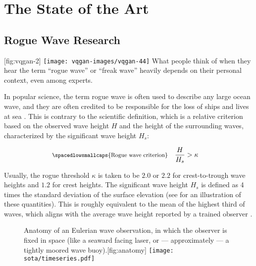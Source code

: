 \chapter{The State of the Art}

\section{Rogue Wave Research} \label{sec:sota-rogue}

[fig:vqgan-2]{
    \texttt{[image: vqgan-images/vqgan-44]}
}
%
What people think of when they hear the term \enquote{rogue wave} or \enquote{freak wave} heavily depends on their personal context, even among experts.

In popular science, the term rogue wave is often used to describe any large ocean wave, and they are often credited to be responsible for the loss of ships and lives at sea \citep{didenkulova_catalogue_2019}. This is contrary to the scientific definition, which is a relative criterion based on the observed wave height $H$ and the height of the surrounding waves, characterized by the significant wave height $H_s$:

\begin{align}
    \text{\footnotesize\spacedlowsmallcaps{Rogue wave criterion}} && \frac{H}{H_s} > \kappa && \label{eq:rogue}
\end{align}

Usually, the rogue threshold $\kappa$ is taken to be $2.0$ or $2.2$ for crest-to-trough wave heights and $1.2$ for crest heights. The significant wave height $H_s$ is defined as 4 times the standard deviation of the surface elevation (see  for an illustration of these quantities). This is roughly equivalent to the mean of the highest third of waves, which aligns with the average wave height reported by a trained observer \citep{holthuijsen_waves_2010}.

\begin{figure}
    \begin{sidecaption}{Anatomy of an Eulerian wave observation, in which the observer is fixed in space (like a seaward facing laser, or --- approximately --- a tightly moored wave buoy).}[fig:anatomy]
		\antimpjustification
		\texttt{[image: sota/timeseries.pdf]}
	\end{sidecaption}
\end{figure}

